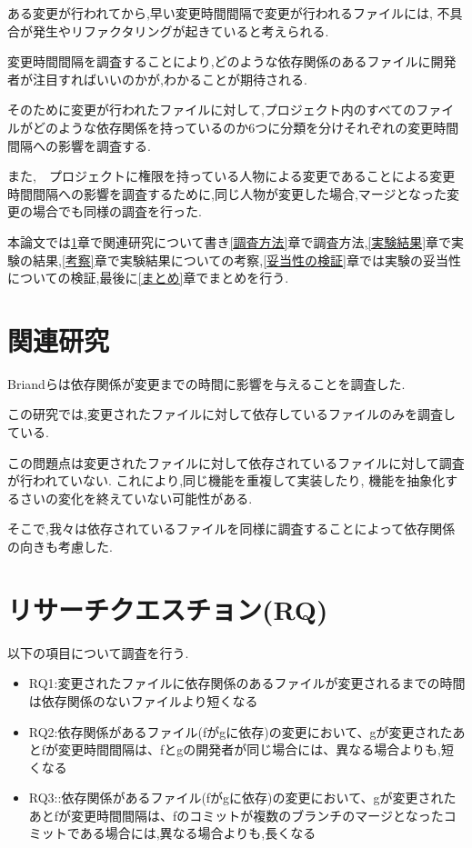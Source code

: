 \documentclass[submit,ses,noauthor]{ipsj} %
\begin{document}
ある変更が行われてから,早い変更時間間隔で変更が行われるファイルには, 不具合が発生やリファクタリングが起きていると考えられる.%

変更時間間隔を調査することにより,どのような依存関係のあるファイルに開発者が注目すればいいのかが,わかることが期待される.

そのために変更が行われたファイルに対して,プロジェクト内のすべてのファイルがどのような依存関係を持っているのか6つに分類を分けそれぞれの変更時間間隔への影響を調査する.

また,　プロジェクトに権限を持っている人物による変更であることによる変更時間間隔への影響を調査するために,同じ人物が変更した場合,マージとなった変更の場合でも同様の調査を行った.


本論文では\ref{関連研究}章で関連研究について書き\ref{調査方法}章で調査方法,\ref{実験結果}章で実験の結果,\ref{考察}章で実験結果についての考察,\ref{妥当性の検証}章では実験の妥当性についての検証,最後に\ref{まとめ}章でまとめを行う.


\section{関連研究}\label{関連研究}

Briand\cite{Briand}らは依存関係が変更までの時間に影響を与えることを調査した.

この研究では,変更されたファイルに対して依存しているファイルのみを調査している.

この問題点は変更されたファイルに対して依存されているファイルに対して調査が行われていない.
これにより,同じ機能を重複して実装したり, 機能を抽象化するさいの変化を終えていない可能性がある.

そこで,我々は依存されているファイルを同様に調査することによって依存関係の向きも考慮した.


\section{リサーチクエスチョン(RQ)}\label{リサーチクエスチョン}
以下の項目について調査を行う.
\begin{itemize}
\item RQ1:変更されたファイルに依存関係のあるファイルが変更されるまでの時間は依存関係のないファイルより短くなる
\item RQ2:依存関係があるファイル(fがgに依存)の変更において、gが変更されたあとfが変更時間間隔は、fとgの開発者が同じ場合には、異なる場合よりも,短くなる
\item RQ3::依存関係があるファイル(fがgに依存)の変更において、gが変更されたあとfが変更時間間隔は、fのコミットが複数のブランチのマージとなったコミットである場合には,異なる場合よりも,長くなる
\end{itemize}
\end{document}

